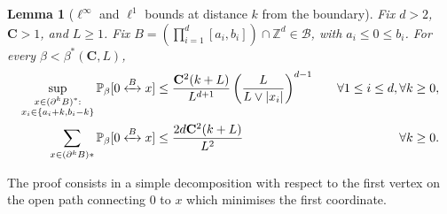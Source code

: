 \documentclass[11pt,a4paper]{article}
\numberwithin{equation}{section}
\theoremstyle{plain}
\newtheorem{Lem}[Thm]{Lemma}
\theoremstyle{definition}
\newcommand\bfC{\mathbf{C}}
\newcommand{\connect}{\xleftrightarrow}
\begin{document}
\begin{Lem}[$\ell^\infty$ and $\ell^1$ bounds at distance $k$ from the boundary]\label{lem: distance k from half-space} Fix $d>2$, $\bfC>1$, and $L\geq 1$. Fix $B=(\prod_{i=1}^d[a_i,b_i])\cap \mathbb Z^d\in \mathcal B$, with $a_i\leq 0 \leq b_i$. For every $\beta<\beta^*(\bfC,L)$, 
\begin{align}    \label{eq: half plane at distance $k$ from half space perco}
    \sup_{\substack{x\in (\partial^k B)^*:\\ x_i\in\{a_i+k,b_i-k\}}} \mathbb P_{\beta}[0\connect{B\:}x]&\le \frac{\bfC^2(k+L)}{L^{d+1}}\left(\frac{L}{L\vee |x_i|}\right)^{d-1}  \quad& \forall 1\leq i\leq d,  \forall k\geq 0,    \\ \label{eq: sum over half plane at distance k from half plane perco}
    \sum_{x\in (\partial^k B)*}\mathbb P_{\beta}[0\connect{B\:}x]&\le \frac{2d\bfC^2(k+L)}{L^2}\quad&\forall k\geq 0.
\end{align}
\end{Lem}
The proof consists in a simple decomposition with respect to the first vertex on the open path connecting $0$ to $x$ which minimises the first coordinate.
\end{document}
